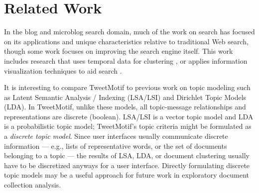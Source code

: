 \documentclass[letterpaper]{article}
\newcommand{\bto}[1]{\textcolor{blue}{\textbf{[#1 --BTO]}}}
\begin{document}
\section{Related Work}




In the blog and microblog search domain, much of the work on search has focused on its applications and unique characteristics relative to traditional Web search, though some work focuses on improving the search engine  itself. This work includes research that uses temporal data for clustering \cite{alonso_clustering_2009}, or applies information visualization techniques to aid search \cite{ferreira-twitviz}.

It is interesting to compare TweetMotif to previous work on topic modeling such as Latent Semantic Analysis / Indexing (LSA/LSI) and Dirichlet Topic Models (LDA).  In TweetMotif, unlike these
models, all topic-message relationships and representations are discrete (boolean).  LSA/LSI is a vector topic model and LDA is a probabilistic topic model; TweetMotif's topic criteria might be formulated as a \emph{discrete topic model}.  Since user interfaces usually communicate discrete information --- e.g., lists of representative words, or the set of documents belonging to a topic --- the results of LSA, LDA, or document clustering usually have to be discretized anyways for a user interface.  Directly formulating discrete topic models may be a useful approach for future work in exploratory document collection analysis.  %







\end{document}
